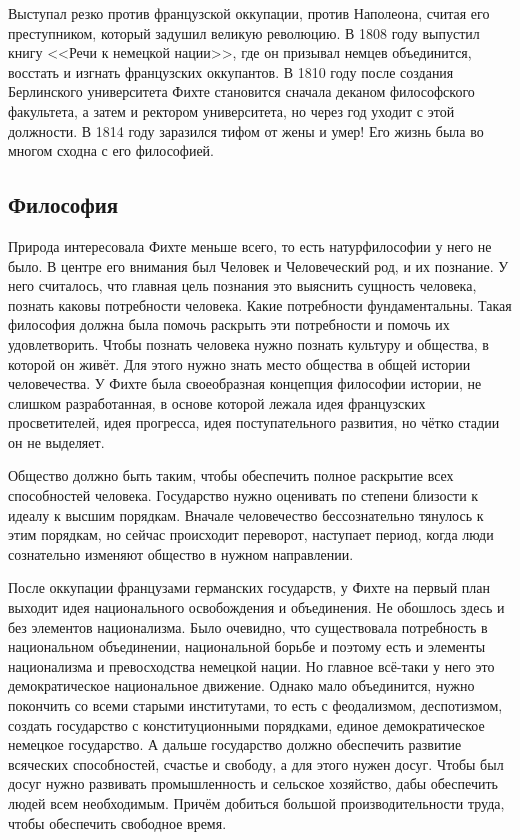 Выступал резко против французской оккупации, против Наполеона, считая его преступником, который задушил великую революцию. В 1808 году выпустил книгу <<Речи к немецкой нации>>, где он призывал немцев объединится, восстать и изгнать французских оккупантов. В 1810 году после создания Берлинского университета Фихте становится сначала деканом философского факультета, а затем и ректором университета, но через год уходит с этой должности. В 1814 году заразился тифом от жены и умер! Его жизнь была во многом сходна с его философией.
\subsection{Философия}

Природа интересовала Фихте меньше всего, то есть натурфилософии у него не было. В центре его внимания был Человек и Человеческий род, и их познание. У него считалось, что главная цель познания это выяснить сущность человека, познать каковы потребности человека. Какие потребности фундаментальны. Такая философия должна была помочь раскрыть эти потребности и помочь их удовлетворить. Чтобы познать человека нужно познать культуру и общества, в которой он живёт. Для этого нужно знать место общества в общей истории человечества. У Фихте была своеобразная концепция философии истории, не слишком разработанная, в основе которой лежала идея французских просветителей, идея прогресса, идея поступательного развития, но чётко стадии он не выделяет.

Общество должно быть таким, чтобы обеспечить полное раскрытие всех способностей человека. Государство нужно оценивать по степени близости к идеалу к высшим порядкам. Вначале человечество бессознательно тянулось к этим порядкам, но сейчас происходит переворот, наступает период, когда люди сознательно изменяют общество в нужном направлении.

После оккупации французами германских государств, у Фихте на первый план выходит идея национального освобождения и объединения. Не обошлось здесь и без элементов национализма. Было очевидно, что существовала потребность в национальном объединении, национальной борьбе и поэтому есть и элементы национализма и превосходства немецкой нации. Но главное всё-таки у него это демократическое национальное движение. Однако мало объединится, нужно покончить со всеми старыми институтами, то есть с феодализмом, деспотизмом, создать государство с конституционными порядками, единое демократическое немецкое государство. А дальше государство должно обеспечить развитие всяческих способностей, счастье и свободу, а для этого нужен досуг. Чтобы был досуг нужно развивать промышленность и сельское хозяйство, дабы обеспечить людей всем необходимым. Причём добиться большой производительности труда, чтобы обеспечить свободное время.

